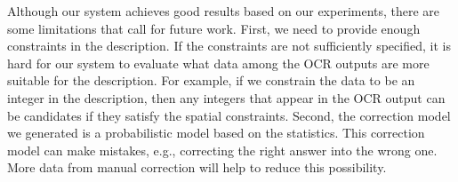 Although our system achieves good results based on our
experiments, there are some limitations that call for future
work. First, we need to provide enough constraints in the description.
If the constraints are not
sufficiently specified, it is hard for our system to evaluate what
data among the OCR outputs are more suitable for the description.
For example, if we constrain the data to be an integer in the
description, then any integers that appear in the OCR output can be
candidates if they satisfy the spatial constraints.
Second, the correction model
we generated is a probabilistic model based on the statistics.
This correction model can make mistakes,
e.g., correcting the right answer into the wrong one. More data
from manual correction will help to reduce this possibility.

